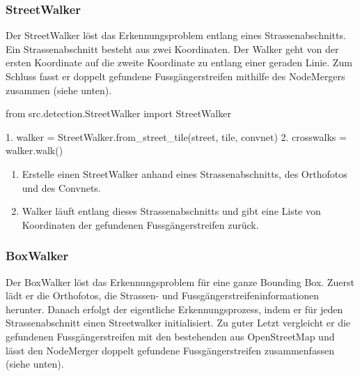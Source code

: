 \subsubsection{StreetWalker}
Der StreetWalker löst das Erkennungsproblem entlang eines Strassenabschnitts. Ein Strassenabschnitt besteht aus zwei Koordinaten. Der Walker geht von der ersten Koordinate auf die zweite Koordinate zu entlang einer geraden Linie. Zum Schluss fasst er doppelt gefundene Fussgängerstreifen mithilfe des NodeMergers zusammen (siehe unten).
\begin{python}
	from src.detection.StreetWalker import StreetWalker
	
	1. walker = StreetWalker.from_street_tile(street, tile, convnet)
	2. crosswalks = walker.walk()
\end{python}
\begin{enumerate}
	\item Erstelle einen StreetWalker anhand eines Strassenabschnitts, des Orthofotos und des Convnets.
	\item Walker läuft entlang dieses Strassenabschnitts und gibt eine Liste von Koordinaten der gefundenen Fussgängerstreifen zurück.
\end{enumerate}

\subsubsection{BoxWalker}
Der BoxWalker löst das Erkennungsproblem für eine ganze Bounding Box. Zuerst lädt er die Orthofotos, die Strassen- und Fussgängerstreifeninformationen herunter. Danach erfolgt der eigentliche Erkennungsprozess, indem er für jeden Strassenabschnitt einen Streetwalker initialisiert. Zu guter Letzt vergleicht er die gefundenen Fussgängerstreifen mit den bestehenden aus OpenStreetMap und lässt den NodeMerger doppelt gefundene Fussgängerstreifen zusammenfassen (siehe unten).

